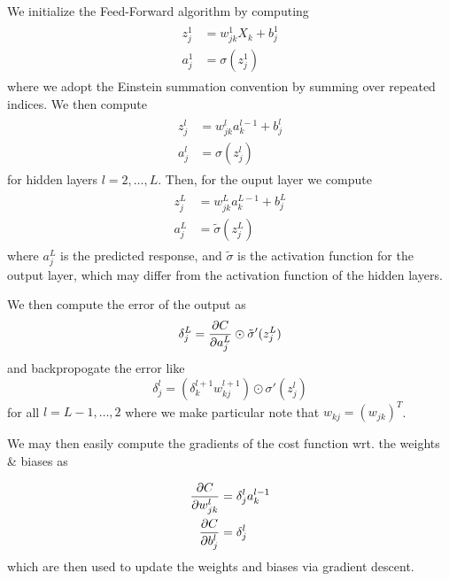 \documentclass{article}
\begin{document}
    \noindent
    We initialize the Feed-Forward algorithm by computing
    \begin{align}\label{eqn: FeedForward Initial}
        \begin{split}
            z^1_j &= w^1_{jk}X_k + b^1_j \\
            a^1_j &= \sigma(z^1_j)
        \end{split}
    \end{align}
    where we adopt the Einstein summation convention by summing over repeated indices.
    We then compute
    \begin{align}
        \begin{split}
            z^l_{j} &= w^l_{jk}a^{l-1}_k + b^l_j \\
            a^l_{j} &= \sigma(z^l_{j})
        \end{split}
    \end{align}
    for hidden layers $l = 2, \dots, L$. Then, for the ouput layer we compute
    \begin{align}
        \begin{split}
            z^{L}_j &= w^{L}_{jk}a^{L-1}_k + b^{L}_j \\
            a^{L}_j &= \tilde\sigma(z^{L}_j)
        \end{split}
    \end{align}
    where $a^{L}_j$ is the predicted response, and $\tilde\sigma$ is the activation function for the output layer, which may differ from the activation function of the hidden layers.

    We then compute the error of the output as
    \begin{equation}
        \delta^{L}_j = \pdv{C}{a^{L}_{j}} \odot \tilde\sigma'(z^{L}_j)
    \end{equation}
    and backpropogate the error like
    \begin{equation}
        \delta^{l}_j = (\delta^{l+1}_{k}w^{l+1}_{kj}) \odot \sigma'(z^l_j)
    \end{equation}
    for all $l = L-1, \dots, 2$ where we make particular note that $w_{kj} = (w_{jk})^T$.

    We may then easily compute the gradients of the cost function wrt. the weights \& biases as

    \begin{align}
        \begin{split}
            \pdv{C}{w_{jk}^l} &= \delta_j^l a^{l-1}_k \\
            \pdv{C}{b^l_j} &= \delta_j^l
        \end{split}
    \end{align}
    which are then used to update the weights and biases via gradient descent.
\end{document}
